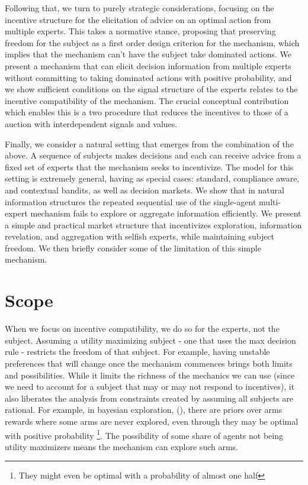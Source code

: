 Following that, we turn to purely strategic considerations, focusing on the incentive structure for the elicitation of advice on an optimal action from multiple experts.
This takes a normative stance, proposing that preserving freedom for the subject as a first order design criterion for the mechanism, which implies that the mechanism can't have the subject take dominated actions.
We present a mechanism that can elicit decision information from multiple experts without committing to taking dominated actions with positive probability, and we show sufficient conditions on the signal structure of the experts relates to the incentive compatibility of the mechanism.
The crucial conceptual contribution which enables this is a two procedure that reduces the incentives to those of a auction with interdependent signals and values. 


Finally, we consider a natural setting that emerges from the combination of the above. A sequence of subjects makes decisions and each can receive advice from a fixed set of experts that the mechanism seeks to incentivize.
The model for this setting is extremely general, having as special cases: standard, compliance aware, and contextual bandits, as well as decision markets.
We show that in natural information structures the repeated sequential use of the single-agent multi-expert mechanism fails to explore or aggregate information efficiently.
We present a simple and practical market structure that incentivizes exploration, information revelation, and aggregation with selfish experts, while maintaining subject freedom. We then briefly consider some of the limitation of this simple mechanism.


\section{Scope}

When we focus on incentive compatibility, we do so for the experts, not the subject.
Assuming a utility maximizing subject - one that uses the max decision rule - restricts the freedom of that subject.
For example, having unstable preferences that will change once the mechanism commences brings both limits and possibilities.
While it limits the richness of the mechanics we can use (since we need to account for a subject that may or may not respond to incentives), it also liberates the analysis from constraints created by assuming all subjects are rational.
For example, in bayesian  exploration, (\cite{mansour2015bayesian}), there are priors over arms rewards where some arms are never explored, even through they may be optimal with positive probability \footnote{They might even be optimal with a probability of almost one half}. The possibility of some share of agents not being utility maximizers means the mechanism can explore such arms.

